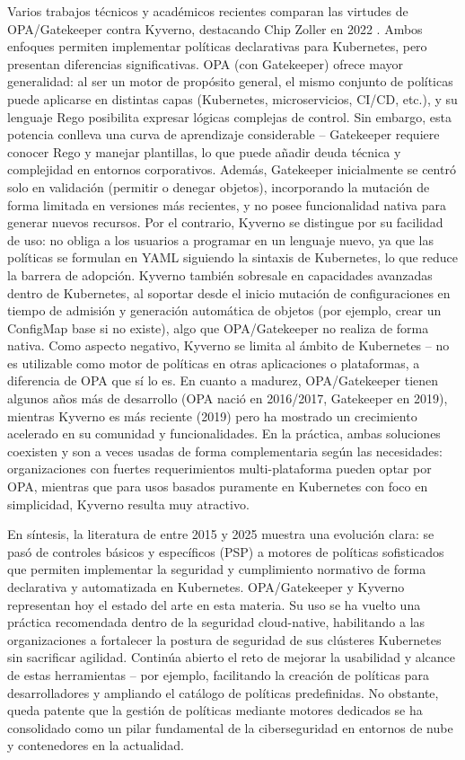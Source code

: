 \documentclass[12pt,twoside,titlepage]{report}
\begin{document}
Varios trabajos técnicos y académicos recientes comparan las virtudes de OPA/Gatekeeper contra Kyverno, destacando Chip Zoller en 2022 \cite{zoller2022kyverno}. Ambos enfoques permiten implementar políticas declarativas para Kubernetes, pero presentan diferencias significativas. OPA (con Gatekeeper) ofrece mayor generalidad: al ser un motor de propósito general, el mismo conjunto de políticas puede aplicarse en distintas capas (Kubernetes, microservicios, CI/CD, etc.), y su lenguaje Rego posibilita expresar lógicas complejas de control. Sin embargo, esta potencia conlleva una curva de aprendizaje considerable – Gatekeeper requiere conocer Rego y manejar plantillas, lo que puede añadir deuda técnica y complejidad en entornos corporativos. Además, Gatekeeper inicialmente se centró solo en validación (permitir o denegar objetos), incorporando la mutación de forma limitada en versiones más recientes, y no posee funcionalidad nativa para generar nuevos recursos. Por el contrario, Kyverno se distingue por su facilidad de uso: no obliga a los usuarios a programar en un lenguaje nuevo, ya que las políticas se formulan en YAML siguiendo la sintaxis de Kubernetes, lo que reduce la barrera de adopción. Kyverno también sobresale en capacidades avanzadas dentro de Kubernetes, al soportar desde el inicio mutación de configuraciones en tiempo de admisión y generación automática de objetos (por ejemplo, crear un ConfigMap base si no existe), algo que OPA/Gatekeeper no realiza de forma nativa. Como aspecto negativo, Kyverno se limita al ámbito de Kubernetes – no es utilizable como motor de políticas en otras aplicaciones o plataformas, a diferencia de OPA que sí lo es. En cuanto a madurez, OPA/Gatekeeper tienen algunos años más de desarrollo (OPA nació en 2016/2017, Gatekeeper en 2019), mientras Kyverno es más reciente (2019) pero ha mostrado un crecimiento acelerado en su comunidad y funcionalidades. En la práctica, ambas soluciones coexisten y son a veces usadas de forma complementaria según las necesidades: organizaciones con fuertes requerimientos multi-plataforma pueden optar por OPA, mientras que para usos basados puramente en Kubernetes con foco en simplicidad, Kyverno resulta muy atractivo.

En síntesis, la literatura de entre 2015 y 2025 muestra una evolución clara: se pasó de controles básicos y específicos (PSP) a motores de políticas sofisticados que permiten implementar la seguridad y cumplimiento normativo de forma declarativa y automatizada en Kubernetes. OPA/Gatekeeper y Kyverno representan hoy el estado del arte en esta materia. Su uso se ha vuelto una práctica recomendada dentro de la seguridad cloud-native, habilitando a las organizaciones a fortalecer la postura de seguridad de sus clústeres Kubernetes sin sacrificar agilidad. Continúa abierto el reto de mejorar la usabilidad y alcance de estas herramientas – por ejemplo, facilitando la creación de políticas para desarrolladores y ampliando el catálogo de políticas predefinidas. No obstante, queda patente que la gestión de políticas mediante motores dedicados se ha consolidado como un pilar fundamental de la ciberseguridad en entornos de nube y contenedores en la actualidad.
\end{document}
